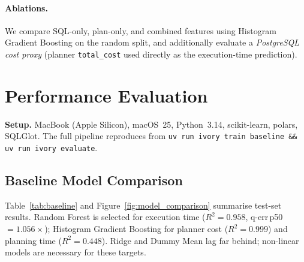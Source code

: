 \documentclass[runningheads]{llncs}
\begin{document}
\paragraph{Ablations.}
We compare SQL-only, plan-only, and combined features using Histogram
Gradient Boosting on the random split, and additionally evaluate a
\emph{PostgreSQL cost proxy} (planner \texttt{total\_cost} used directly
as the execution-time prediction).

\section{Performance Evaluation}
\label{sec:eval}

\noindent\textbf{Setup.}
MacBook (Apple Silicon), macOS~25, Python~3.14, scikit-learn, polars,
SQLGlot.
The full pipeline reproduces from \texttt{uv run ivory train baseline \&\&
uv run ivory evaluate}.

\subsection{Baseline Model Comparison}

Table~\ref{tab:baseline} and Figure~\ref{fig:model_comparison} summarise
test-set results.
Random Forest is selected for execution time ($R^2=0.958$,
q-err\,p50\,$=1.056\times$); Histogram Gradient Boosting for planner cost
($R^2=0.999$) and planning time ($R^2=0.448$).
Ridge and Dummy Mean lag far behind; non-linear models are necessary for
these targets.
\end{document}
